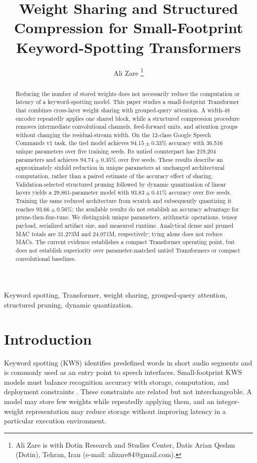 \documentclass[journal]{IEEEtran}
\title{Weight Sharing and Structured Compression for
Small-Footprint Keyword-Spotting Transformers}
\author{Ali Zare%
\thanks{Ali Zare is with Dotin Research and Studies Center,
Datis Arian Qeshm (Dotin), Tehran, Iran
(e-mail: alizare84@gmail.com).}}
\begin{document}
\maketitle

\begin{abstract}
Reducing the number of stored weights does not necessarily reduce
the computation or latency of a keyword-spotting model.
This paper studies a small-footprint Transformer that combines
cross-layer weight sharing with grouped-query attention.
A width-48 encoder repeatedly applies one shared block, while a
structured compression procedure removes intermediate convolutional
channels, feed-forward units, and attention groups without changing
the residual-stream width.
On the 12-class Google Speech Commands v1 task, the tied model
achieves $94.15\pm0.33\%$ accuracy with 36,516 unique parameters
over five training seeds.
Its untied counterpart has 219,204 parameters and achieves
$94.74\pm0.35\%$ over five seeds.
These results describe an approximately sixfold reduction in unique
parameters at unchanged architectural computation, rather than a
paired estimate of the accuracy effect of sharing.
Validation-selected structured pruning followed by dynamic
quantization of linear layers yields a 29,861-parameter model
with $93.83\pm0.41\%$ accuracy over five seeds.
Training the same reduced architecture from scratch and subsequently
quantizing it reaches $93.66\pm0.56\%$; the available results do not
establish an accuracy advantage for prune-then-fine-tune.
We distinguish unique parameters, arithmetic operations, tensor
payload, serialized artifact size, and measured runtime.
Analytical dense and pruned MAC totals are 31.273M and 24.071M,
respectively; tying alone does not reduce MACs.
The current evidence establishes a compact Transformer operating
point, but does not establish superiority over parameter-matched
untied Transformers or compact convolutional baselines.
\end{abstract}

\begin{IEEEkeywords}
Keyword spotting, Transformer, weight sharing,
grouped-query attention, structured pruning,
dynamic quantization.
\end{IEEEkeywords}

\section{Introduction}

Keyword spotting (KWS) identifies predefined words in short audio
segments and is commonly used as an entry point to speech interfaces.
Small-footprint KWS models must balance recognition accuracy with
storage, computation, and deployment constraints
\cite{zhang2017hello,warden2018speech}.
These constraints are related but not interchangeable.
A model may store few weights while repeatedly applying them,
and an integer-weight representation may reduce storage without
improving latency in a particular execution environment.
\end{document}
